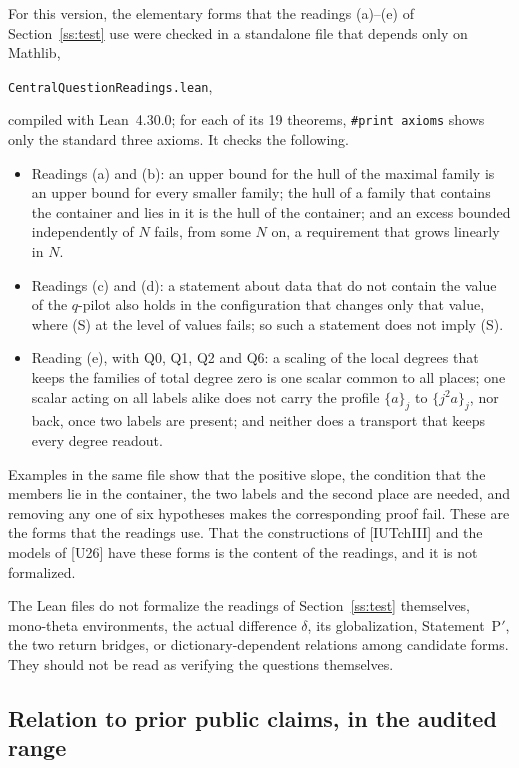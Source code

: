 \documentclass[11pt]{article}
\theoremstyle{definition}
\begin{document}
For this version, the elementary forms that the readings (a)--(e)
of Section~\ref{ss:test} use were checked in a standalone file that
depends only on Mathlib,
\begin{center}\small
\texttt{CentralQuestionReadings.lean},
\end{center}
compiled with Lean~4.30.0; for each of its 19 theorems,
\texttt{\#print axioms} shows only the standard three axioms.  It
checks the following.
\begin{itemize}[leftmargin=*]
\item Readings (a) and (b): an upper bound for the hull of the
maximal family is an upper bound for every smaller family; the hull
of a family that contains the container and lies in it is the hull
of the container; and an excess bounded independently of $N$ fails,
from some $N$ on, a requirement that grows linearly in $N$.
\item Readings (c) and (d): a statement about data that do not
contain the value of the $q$-pilot also holds in the configuration
that changes only that value, where (S) at the level of values
fails; so such a statement does not imply (S).
\item Reading (e), with Q0, Q1, Q2 and Q6: a scaling of the local
degrees that keeps the families of total degree zero is one scalar
common to all places; one scalar acting on all labels alike does not
carry the profile $\{a\}_j$ to $\{j^2a\}_j$, nor back, once two
labels are present; and neither does a transport that keeps every
degree readout.
\end{itemize}
Examples in the same file show that the positive slope, the
condition that the members lie in the container, the two labels and
the second place are needed, and removing any one of six hypotheses
makes the corresponding proof fail.  These are the forms that the
readings use.  That the constructions of [IUTchIII] and the models
of [U26] have these forms is the content of the readings, and it is
not formalized.

The Lean files do not formalize the readings of
Section~\ref{ss:test} themselves, mono-theta environments, the
actual difference $\delta$, its globalization, Statement~P$'$,
the two return bridges, or dictionary-dependent relations among
candidate forms.  They should not be read as verifying the
questions themselves.

\subsection{Relation to prior public claims, in the audited range}
\end{document}
